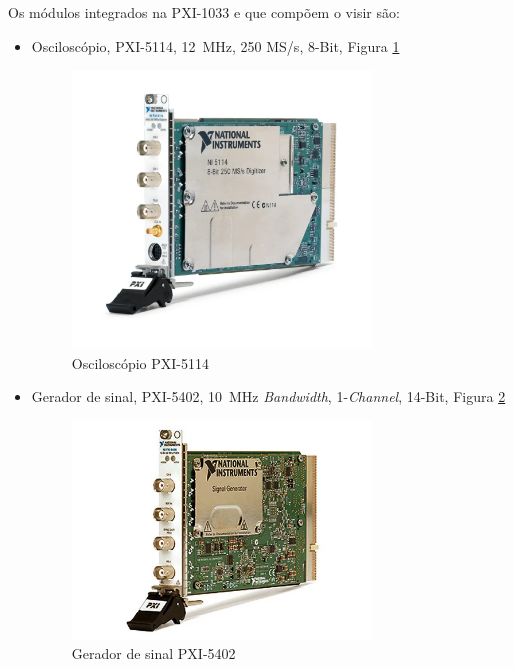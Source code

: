 Os módulos integrados na PXI-1033 e que compõem o \acrshort{visir} são:
\begin{itemize}
    \item Osciloscópio, PXI-5114, \SI{12}{\MHz}, 250 MS/s, 8-Bit, Figura \ref{fig:PXI-5114}
        \begin{figure}[hbtp]
            \centering
            \includegraphics[width=0.75\textwidth]{figures/PXI-5114.png}
            \caption{Osciloscópio PXI-5114 \cite{PXI-5114}}
            \label{fig:PXI-5114}
        \end{figure}
    \item Gerador de sinal, PXI-5402, \SI{10}{\MHz} \textit{Bandwidth}, 1-\textit{Channel}, 14-Bit, Figura \ref{fig:PXI-5402}
        \begin{figure}[hbtp]
            \centering
            \includegraphics[width=0.75\textwidth]{figures/PXI-5402.png}
            \caption{Gerador de sinal PXI-5402 \cite{PXI-5402}}
            \label{fig:PXI-5402}
        \end{figure}

\end{itemize}
